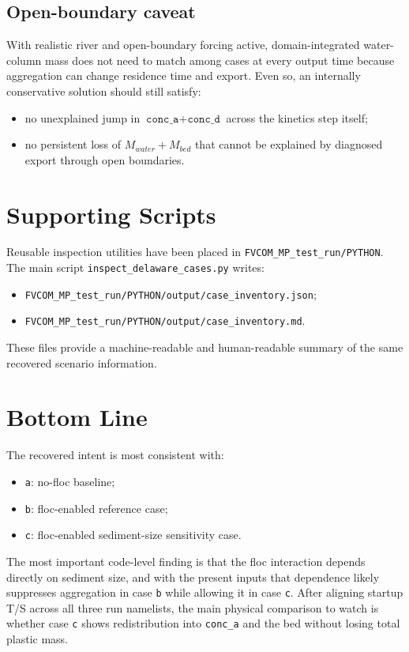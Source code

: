 \documentclass[11pt]{article}
\begin{document}
\subsection{Open-boundary caveat}
With realistic river and open-boundary forcing active, domain-integrated water-column mass does not need to
match among cases at every output time because aggregation can change residence time and export. Even so, an
internally conservative solution should still satisfy:
\begin{itemize}
\item no unexplained jump in \(\texttt{conc\_a}+\texttt{conc\_d}\) across the kinetics step itself;
\item no persistent loss of \(M_{water}+M_{bed}\) that cannot be explained by diagnosed export through open
boundaries.
\end{itemize}

\section{Supporting Scripts}
Reusable inspection utilities have been placed in \texttt{FVCOM\_MP\_test\_run/PYTHON}. The main script
\texttt{inspect\_delaware\_cases.py} writes:
\begin{itemize}
\item \texttt{FVCOM\_MP\_test\_run/PYTHON/output/case\_inventory.json};
\item \texttt{FVCOM\_MP\_test\_run/PYTHON/output/case\_inventory.md}.
\end{itemize}

These files provide a machine-readable and human-readable summary of the same recovered scenario information.

\section{Bottom Line}
The recovered intent is most consistent with:
\begin{itemize}
\item \texttt{a}: no-floc baseline;
\item \texttt{b}: floc-enabled reference case;
\item \texttt{c}: floc-enabled sediment-size sensitivity case.
\end{itemize}

The most important code-level finding is that the floc interaction depends directly on sediment size, and
with the present inputs that dependence likely suppresses aggregation in case \texttt{b} while allowing it
in case \texttt{c}. After aligning startup T/S across all three run namelists, the main physical comparison
to watch is whether case \texttt{c} shows redistribution into \texttt{conc\_a} and the bed without losing
total plastic mass.
\end{document}
